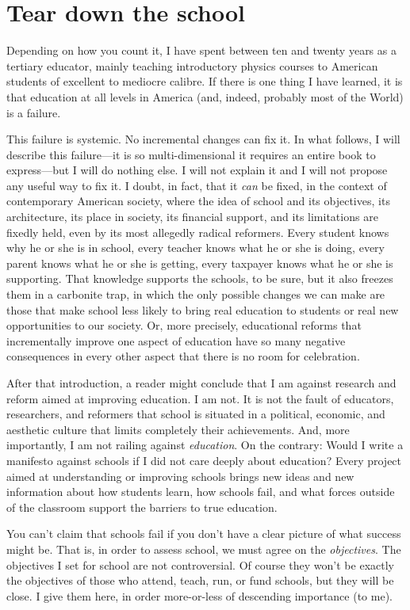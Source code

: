 \documentclass[11pt]{book}
\begin{document}
\chapter{Tear down the school}

Depending on how you count it, I have spent between ten and twenty
years as a tertiary educator, mainly teaching introductory physics
courses to American students of excellent to mediocre calibre.  If
there is one thing I have learned, it is that education at all levels
in America (and, indeed, probably most of the World) is a failure.

This failure is systemic.  No incremental changes can fix it.  In what
follows, I will describe this failure---it is so multi-dimensional it
requires an entire book to express---but I will do nothing else.  I
will not explain it and I will not propose any useful way to fix it.
I doubt, in fact, that it \emph{can} be fixed, in the context of
contemporary American society, where the idea of school and its
objectives, its architecture, its place in society, its financial
support, and its limitations are fixedly held, even by its most
allegedly radical reformers.  Every student knows why he or she is in
school, every teacher knows what he or she is doing, every parent
knows what he or she is getting, every taxpayer knows what he or she
is supporting.  That knowledge supports the schools, to be sure, but
it also freezes them in a carbonite trap, in which the only possible
changes we can make are those that make school less likely to bring
real education to students or real new opportunities to our society.
Or, more precisely, educational reforms that incrementally improve one
aspect of education have so many negative consequences in every other
aspect that there is no room for celebration.

After that introduction, a reader might conclude that I am against
research and reform aimed at improving education.  I am not.  It is
not the fault of educators, researchers, and reformers that school is
situated in a political, economic, and aesthetic culture that limits
completely their achievements.  And, more importantly, I am not
railing against \emph{education}.  On the contrary: Would I write a
manifesto against schools if I did not care deeply about education?
Every project aimed at understanding or improving schools brings new
ideas and new information about how students learn, how schools fail,
and what forces outside of the classroom support the barriers to true
education.

You can't claim that schools fail if you don't have a clear picture of
what success might be.  That is, in order to assess school, we must
agree on the \emph{objectives}.  The objectives I set for school are
not controversial.  Of course they won't be exactly the objectives of
those who attend, teach, run, or fund schools, but they will be close.
I give them here, in order more-or-less of descending importance (to
me).
\end{document}
